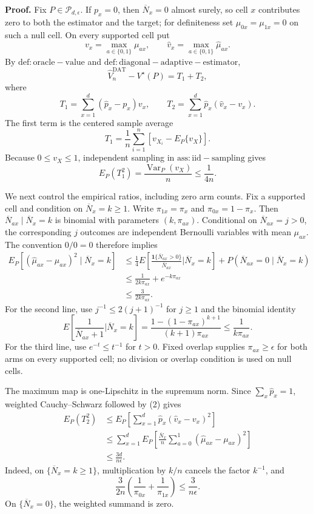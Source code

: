 \textbf{Proof.}
Fix \(P\in\mathcal P_{d,\epsilon}\).  If \(p_x=0\), then \(\overline N_x=0\) almost surely, so cell \(x\) contributes zero to both the estimator and the target; for definiteness set \(\mu_{0x}=\mu_{1x}=0\) on such a null cell.  On every supported cell put
\[
 v_x=\max_{a\in\{0,1\}}\mu_{ax},
 \qquad
 \widehat v_x=\max_{a\in\{0,1\}}\widehat\mu_{ax}.
\]
By \(\mathrm{def:oracle-value}\) and \(\mathrm{def:diagonal-adaptive-estimator}\),
\[
 \widehat V_n^{\mathrm{DAT}}-V^\star(P)=T_1+T_2,
\]
where
\[
 T_1=\sum_{x=1}^d(\widehat p_x-p_x)v_x,
 \qquad
 T_2=\sum_{x=1}^d\widehat p_x(\widehat v_x-v_x).
\]
The first term is the centered sample average
\[
 T_1=\frac1n\sum_{i=1}^n
 \left[v_{X_i}-E_P\{v_X\}\right].
\]
Because \(0\le v_X\le1\), independent sampling in \(\mathrm{ass:iid-sampling}\) gives
\[
 E_P(T_1^2)=\frac{\operatorname{Var}_P(v_X)}n\le\frac1{4n}.
\tag{1}
\]

We next control the empirical ratios, including zero arm counts.  Fix a supported cell and condition on \(\overline N_x=k\ge1\).  Write \(\pi_{1x}=\pi_x\) and \(\pi_{0x}=1-\pi_x\).  Then
\(\overline N_{ax}\mid\overline N_x=k\) is binomial with parameters \((k,\pi_{ax})\).  Conditional on \(\overline N_{ax}=j>0\), the corresponding \(j\) outcomes are independent Bernoulli variables with mean \(\mu_{ax}\).  The convention \(0/0=0\) therefore implies
\[
 \begin{aligned}
 E_P\!\left[
   (\widehat\mu_{ax}-\mu_{ax})^2
   \mid \overline N_x=k
 \right]
 &\le \frac14 E\!\left[
    \frac{\mathbf 1\{\overline N_{ax}>0\}}{\overline N_{ax}}
    \mathrel{\Big|}\overline N_x=k
  \right]
  +P(\overline N_{ax}=0\mid\overline N_x=k)\\
 &\le \frac1{2k\pi_{ax}}+e^{-k\pi_{ax}}\\
 &\le \frac3{2k\pi_{ax}}.
\tag{2}
 \end{aligned}
\]
For the second line, use \(j^{-1}\le2(j+1)^{-1}\) for \(j\ge1\) and the binomial identity
\[
 E\!\left[
   \frac1{\overline N_{ax}+1}
   \mathrel{\Big|}\overline N_x=k
 \right]
 =\frac{1-(1-\pi_{ax})^{k+1}}{(k+1)\pi_{ax}}
 \le\frac1{k\pi_{ax}}.
\]
For the third line, use \(e^{-t}\le t^{-1}\) for \(t>0\).  Fixed overlap supplies \(\pi_{ax}\ge\epsilon\) for both arms on every supported cell; no division or overlap condition is used on null cells.

The maximum map is one-Lipschitz in the supremum norm.  Since \(\sum_x\widehat p_x=1\), weighted Cauchy--Schwarz followed by (2) gives
\[
 \begin{aligned}
 E_P(T_2^2)
 &\le E_P\!\left[
   \sum_{x=1}^d\widehat p_x(\widehat v_x-v_x)^2
 \right]\\
 &\le \sum_{x=1}^d E_P\!\left[
   \frac{\overline N_x}{n}
   \sum_{a=0}^1(\widehat\mu_{ax}-\mu_{ax})^2
 \right]\\
 &\le \frac{3d}{n\epsilon}.
\tag{3}
 \end{aligned}
\]
Indeed, on \(\{\overline N_x=k\ge1\}\), multiplication by \(k/n\) cancels the factor \(k^{-1}\), and
\[
 \frac3{2n}\left(\frac1{\pi_{0x}}+\frac1{\pi_{1x}}\right)
 \le\frac3{n\epsilon}.
\]
On \(\{\overline N_x=0\}\), the weighted summand is zero.

